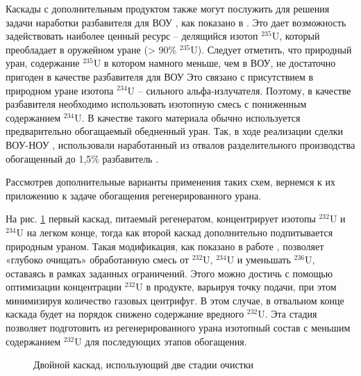 Каскады с дополнительным продуктом также могут послужить для решения задачи наработки разбавителя для ВОУ \cite{palkinPOLUChENIERAZBAVITELYaDLYa2017}, как показано в \cite{shopenSposobPolucheniyaRazbavitelya2008}.
Это дает возможность задействовать наиболее ценный ресурс -- делящийся изотоп $^{235}$U, который преобладает в оружейном уране (> 90\% $^{235}$U).
Следует отметить, что природный уран, содержание $^{235}$U в котором намного меньше, чем в ВОУ, не достаточно пригоден в качестве разбавителя для ВОУ
Это связано с присутствием в природном уране изотопа $^{234}$U -- сильного альфа-излучателя.
Поэтому, в качестве разбавителя необходимо использовать изотопную смесь с пониженным содержанием $^{234}$U.
В качестве такого материала обычно используется предварительно обогащаемый обедненный уран.
Так, в ходе реализации сделки ВОУ-НОУ \cite{korotkevichRealizaciyaProgrammyVOUNOU2003}, использовали наработанный из отвалов разделительного производства обогащенный до 1,5\% разбавитель \cite{SposobPolucheniyaRazbavitelya}.

Рассмотрев дополнительные варианты применения таких схем, вернемся к их приложению к задаче обогащения регенерированного урана.

На рис. \ref{fig:double_palk} первый каскад, питаемый регенератом, концентрирует изотопы $^{232}$U и $^{234}$U на легком конце, тогда как второй каскад дополнительно подпитывается природным ураном.
Такая модификация, как показано в работе , позволяет «глубоко очищать» обработанную смесь от $^{232}$U, $^{234}$U и уменьшать  $^{236}$U, оставаясь в рамках заданных ограничений.
Этого можно достичь с помощью оптимизации концентрации $^{232}$U в продукте, варьируя точку подачи, при этом минимизируя количество газовых центрифуг.
В этом случае, в отвальном конце каскада будет на порядок снижено содержание вредного $^{232}$U.
Эта стадия позволяет подготовить из регенерированного урана изотопный состав с меньшим содержанием $^{232}$U для последующих этапов обогащения.
\begin{figure}[ht]
  \caption{Двойной каскад, использующий две стадии очистки}\label{fig:double_palk}
\end{figure}

